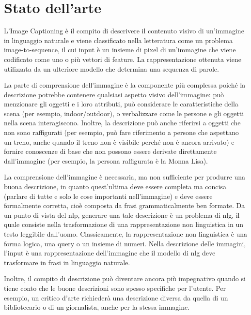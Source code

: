 \chapter{Stato dell'arte}\label{sec:Stato dell'arte}

L'Image Captioning è il compito di descrivere il contenuto visivo di un'immagine in linguaggio naturale e viene classificato nella letteratura come un problema image-to-sequence, il cui input è un insieme di pixel di un'immagine che viene codificato come uno o più vettori di feature. La rappresentazione ottenuta viene utilizzata da un ulteriore modello che determina una sequenza di parole.

La parte di comprensione dell'immagine è la componente più complessa poiché la descrizione potrebbe contenere qualsiasi aspetto visivo dell'immagine: può menzionare gli oggetti e i loro attributi, può considerare le caratteristiche della scena (per esempio, indoor/outdoor), o verbalizzare come le persone e gli oggetti nella scena interagiscono. Inoltre, la descrizione può anche riferirsi a oggetti che non sono raffigurati (per esempio, può fare riferimento a persone che aspettano un treno, anche quando il treno non è visibile perché non è ancora arrivato) e fornire conoscenze di base che non possono essere derivate direttamente dall'immagine (per esempio, la persona raffigurata è la Monna Lisa).


La comprensione dell'immagine è necessaria, ma non sufficiente per produrre una buona descrizione, in quanto quest'ultima deve essere completa ma concisa (parlare di tutte e solo le cose importanti nell'immagine) e deve essere formalmente corretta, cioè composta da frasi grammaticalmente ben formate. Da un punto di vista del \acrshort{nlp}, generare una tale descrizione è un problema di \acrfull{nlg}, il quale consiste nella trasformazione di una rappresentazione non linguistica in un testo leggibile dall'uomo. Classicamente, la rappresentazione non linguistica è una forma logica, una query o un insieme di numeri. Nella descrizione delle immagini, l'input è una rappresentazione dell'immagine che il modello di \acrshort{nlg} deve trasformare in frasi in linguaggio naturale.

Inoltre, il compito di descrizione può diventare ancora più impegnativo quando si tiene conto che le buone descrizioni sono spesso specifiche per l'utente. Per esempio, un critico d'arte richiederà una descrizione diversa da quella di un bibliotecario o di un giornalista, anche per la stessa immagine.

